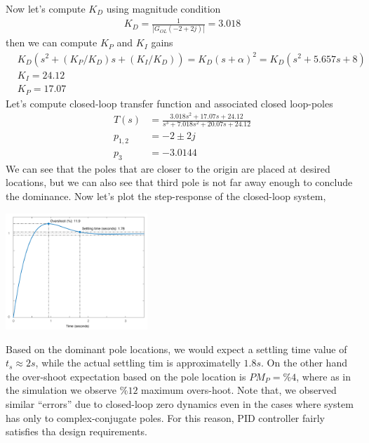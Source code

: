 \documentclass[twoside]{article}
\begin{document}
%
Now let's compute $K_D$ using magnitude condition
%
\begin{align*}
  K_D = \frac{1}{| G_{OL}(-2 + 2 j) |} = 3.018
\end{align*}
%
then we can compute $K_P$ and $K_I$ gains 
\begin{align*}
& K_D \left( s^2 +   (K_P/K_D) s  + (K_I/K_D)  \right)
= K_D (s+\alpha)^2 = K_D ( s^2 + 5.657 s + 8)
\\
& K_I = 24.12
\\
& K_P = 17.07
\end{align*}
%
Let's compute closed-loop transfer function and associated
closed loop-poles
%
\begin{align*}
  T(s) &= \frac{ 3.018 s^2 + 17.07 s + 24.12 }{ s^3 + 7.018 s^2 + 20.07
  s + 24.12  }
  \\
  p_{1,2} &= -2 \pm 2 j
\\
p_{3} &= -3.0144
\end{align*}
%
We can see that the poles that are closer to the origin are placed at 
desired locations, but we can also see that third pole is not
far away enough to conclude the dominance. Now let's plot the
step-response of the closed-loop system,

\vspace{6 pt}

  \begin{minipage}[h]{1\linewidth}
    \begin{center}
      \includegraphics[width=0.4\textwidth]{PIDexample}
    \end{center}
  \end{minipage}

\vspace{6 pt}

Based on the dominant pole locations, we would expect a settling
time value of $t_{s} \approx 2 s$, while the actual settling tim is 
approximatelly $1.8 s$. On the other hand the over-shoot expectation
based on the pole location is $PM_P = \%4$, where as in the simulation
we observe $\%12$ maximum overs-hoot. Note that, we observed similar
``errors'' due to closed-loop zero dynamics even in the cases where 
system has only to complex-conjugate poles. For this reason, PID
controller fairly satisfies tha design requirements. 


\end{document}

